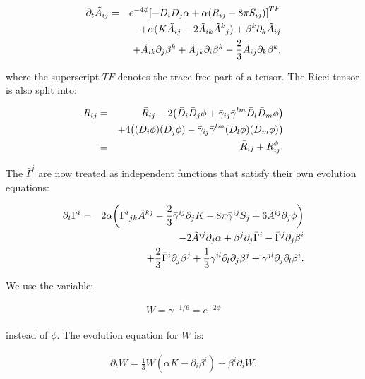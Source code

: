 \documentclass[]{article}
\begin{document}
\begin{eqnarray}
	\label{eq:bssn_A}
	\partial_t \tilde{A}_{ij} &=& e^{-4\phi}\qty[-D_iD_j\alpha + \alpha(R_{ij} - 8\pi S_{ij})]^{TF}\nonumber\\&& + \alpha(K\tilde{A}_{ij} - 2\tilde{A}_{ik}\tilde{A}^k{}_{j}) + \beta^k\partial_k \tilde{A}_{ij} \nonumber\\&&+ \tilde{A}_{ik}\partial_j\beta^k + \tilde{A}_{jk}\partial_i\beta^k - \frac{2}{3}\tilde{A}_{ij}\partial_k\beta^k,
\end{eqnarray}

where the superscript $TF$ denotes the trace-free part of a tensor. The Ricci tensor is also split into:

\begin{eqnarray}
	R_{ij}
	&=& \bar{R}_{ij} - 2 \qty(\bar{D}_i\bar{D}_j \phi + \bar{\gamma}_{ij}\bar{\gamma}^{lm}\bar{D}_l \bar{D}_m \phi)\nonumber\\&&+4\qty((\bar{D}_i \phi)(\bar{D}_j \phi) - \bar{\gamma}_{ij}\bar{\gamma}^{lm}(\bar{D}_l \phi)(\bar{D}_m \phi) )\nonumber\\
	&\equiv& \bar{R}_{ij} + R^\phi_{ij}.
\end{eqnarray}

The $\bar{\Gamma}^{i}$ are now treated as independent functions that satisfy their own evolution equations:

\begin{eqnarray}
	\label{eq:bssn_Gamma}
	\partial_t \bar{\Gamma}^i &=& 2\alpha \qty(\bar{\Gamma}^i{}_{jk} \tilde{A}^{kj} - \frac{2}{3}\bar{\gamma}^{ij}\partial_j K - 8\pi \bar{\gamma}^{ij} S_j + 6\tilde{A}^{ij}\partial_j \phi) \nonumber\\&& -2\tilde{A}^{ij}\partial_j \alpha + \beta^j \partial_j \bar{\Gamma}^i - \bar{\Gamma}^j \partial_j \beta^i \nonumber\\&&+ \frac{2}{3}\bar{\Gamma}^i \partial_j \beta^j + \frac{1}{3}\bar{\gamma}^{il}\partial_l \partial_j \beta^j + \bar{\gamma}^{jl}\partial_j\partial_l\beta^i.
\end{eqnarray}

We use the variable:

\begin{eqnarray}
	W = \gamma^{-1/6} = e^{-2\phi}
\end{eqnarray}

instead of $\phi$. The evolution equation for $W$ is:

\begin{eqnarray}
	\label{eq:bssn_W}
	\partial_t W = \frac{1}{3}W(\alpha K - \partial_i \beta^i)+\beta^i \partial_i W.
\end{eqnarray}
\end{document}
